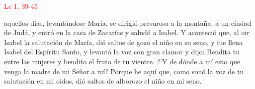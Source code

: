 \hfill\textcolor{red}{Lc 1, 39-45}

aquellos días, levantándose María, se dirigió presurosa a la montaña, a un ciudad de Judá, y entró en la casa de Zacarías y saludó a Isabel.
Y aconteció que, al oir Isabel la salutación de María, dió saltos de gozo el niño en su seno, y fue llena Isabel del Espíritu Santo, y levantó la voz con gran clamor y dijo:
Bendita tu entre las mujeres y bendito el fruto de tu vientre. {?`}Y de dónde a mí esto que venga la madre de mi Señor a mí? Porque he aquí que, como sonó la voz de tu salutación en mi oídos,
dió saltos de alborozo el niño en mi seno.